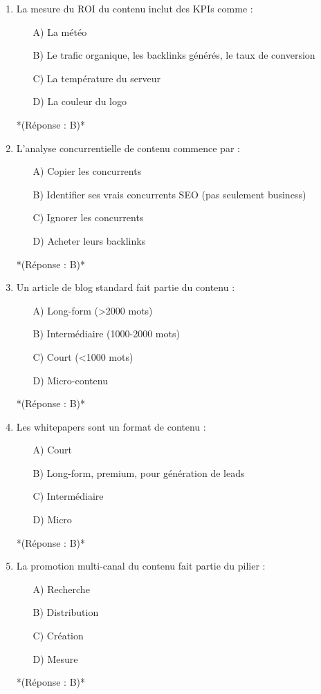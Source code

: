 \documentclass[12pt,a4paper,twoside]{report}
\begin{document}
\begin{enumerate}
\item La mesure du ROI du contenu inclut des KPIs comme :
\begin{itemize}
\item[A)] La météo
\item[B)] Le trafic organique, les backlinks générés, le taux de conversion
\item[C)] La température du serveur
\item[D)] La couleur du logo
\end{itemize}
*(Réponse : B)*

\item L'analyse concurrentielle de contenu commence par :
\begin{itemize}
\item[A)] Copier les concurrents
\item[B)] Identifier ses vrais concurrents SEO (pas seulement business)
\item[C)] Ignorer les concurrents
\item[D)] Acheter leurs backlinks
\end{itemize}
*(Réponse : B)*

\item Un article de blog standard fait partie du contenu :
\begin{itemize}
\item[A)] Long-form (>2000 mots)
\item[B)] Intermédiaire (1000-2000 mots)
\item[C)] Court (<1000 mots)
\item[D)] Micro-contenu
\end{itemize}
*(Réponse : B)*

\item Les whitepapers sont un format de contenu :
\begin{itemize}
\item[A)] Court
\item[B)] Long-form, premium, pour génération de leads
\item[C)] Intermédiaire
\item[D)] Micro
\end{itemize}
*(Réponse : B)*

\item La promotion multi-canal du contenu fait partie du pilier :
\begin{itemize}
\item[A)] Recherche
\item[B)] Distribution
\item[C)] Création
\item[D)] Mesure
\end{itemize}
*(Réponse : B)*


\end{enumerate}
\end{document}

